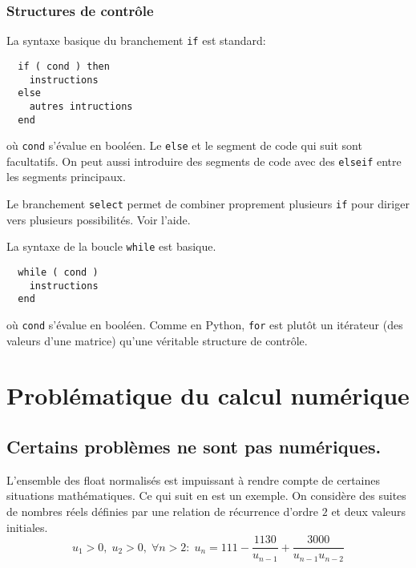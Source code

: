 \subsubsection{Structures de contrôle}
La syntaxe basique du branchement \texttt{if} est standard:
\begin{verbatim}
  if ( cond ) then
    instructions
  else
    autres intructions
  end
\end{verbatim}
où \texttt{cond} s'évalue en booléen. Le \texttt{else} et le segment de code qui suit sont facultatifs. On peut aussi introduire des segments de code avec des \texttt{elseif} entre les segments principaux.

Le branchement \texttt{select} permet de combiner proprement plusieurs \texttt{if} pour diriger vers plusieurs possibilités. Voir l'aide.

La syntaxe de la boucle \texttt{while} est basique.
\begin{verbatim}
  while ( cond )
    instructions
  end
\end{verbatim}
où \texttt{cond} s'évalue en booléen. Comme en Python, \texttt{for} est plutôt un itérateur (des valeurs d'une matrice) qu'une véritable structure de contrôle.


\section{Problématique du calcul numérique}
\subsection{Certains problèmes ne sont pas numériques.}
L'ensemble des float normalisés est impuissant à rendre compte de certaines situations mathématiques. Ce qui suit en est un exemple.\newline
On considère des suites de nombres réels définies par une relation de récurrence d'ordre $2$ et deux valeurs initiales.
\begin{displaymath}
  u_1>0,\; u_2>0,\;
  \forall n>2:\;
  u_{n}= 111 - \frac{1130}{u_{n-1}} + \frac{3000}{u_{n-1}u_{n-2}}
\end{displaymath}
